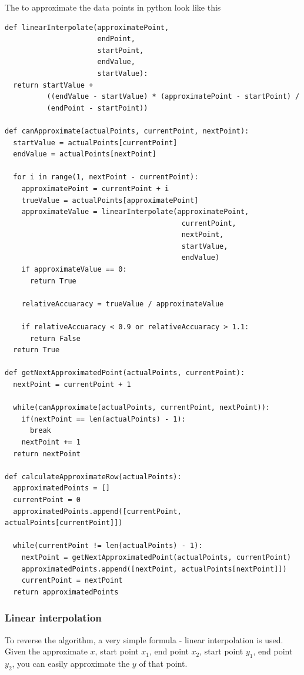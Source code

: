 \documentclass[12pt]{article}
\begin{document}
The to approximate the data points in python look like this
\newpage
\begin{verbatim}
def linearInterpolate(approximatePoint,
                      endPoint,
                      startPoint,
                      endValue,
                      startValue):
  return startValue +
          ((endValue - startValue) * (approximatePoint - startPoint) /
          (endPoint - startPoint))

def canApproximate(actualPoints, currentPoint, nextPoint):
  startValue = actualPoints[currentPoint]
  endValue = actualPoints[nextPoint]

  for i in range(1, nextPoint - currentPoint):
    approximatePoint = currentPoint + i
    trueValue = actualPoints[approximatePoint]
    approximateValue = linearInterpolate(approximatePoint,
                                          currentPoint,
                                          nextPoint,
                                          startValue,
                                          endValue)
    if approximateValue == 0:
      return True

    relativeAccuaracy = trueValue / approximateValue

    if relativeAccuaracy < 0.9 or relativeAccuaracy > 1.1:
      return False
  return True

def getNextApproximatedPoint(actualPoints, currentPoint):
  nextPoint = currentPoint + 1

  while(canApproximate(actualPoints, currentPoint, nextPoint)):
    if(nextPoint == len(actualPoints) - 1):
      break
    nextPoint += 1
  return nextPoint

def calculateApproximateRow(actualPoints):
  approximatedPoints = []
  currentPoint = 0
  approximatedPoints.append([currentPoint, actualPoints[currentPoint]])

  while(currentPoint != len(actualPoints) - 1):
    nextPoint = getNextApproximatedPoint(actualPoints, currentPoint)
    approximatedPoints.append([nextPoint, actualPoints[nextPoint]])
    currentPoint = nextPoint
  return approximatedPoints

\end{verbatim}

\subsubsection{Linear interpolation}
To reverse the algorithm, a very simple formula - linear interpolation is used. Given the approximate $x$, start point $x_1$, end point $x_2$, start point $y_1$, end point $y_2$, you can easily approximate the $y$ of that point.
\end{document}
